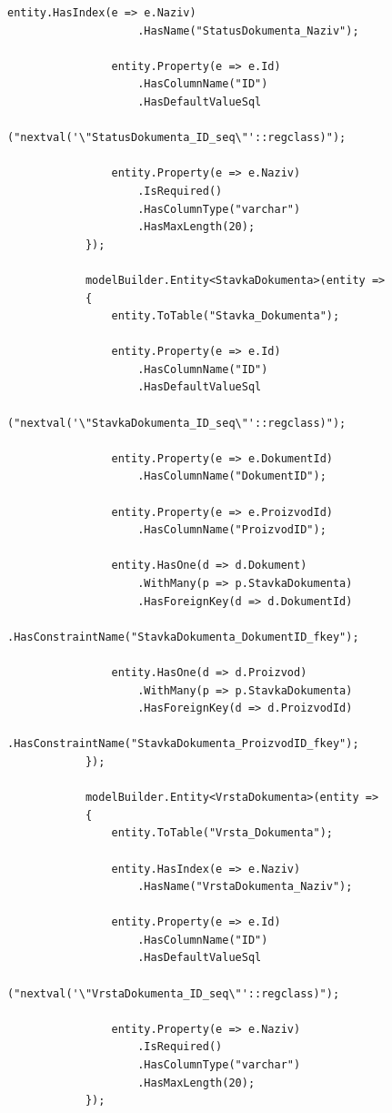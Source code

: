 \documentclass[a4paper,12pt]{foi}
\begin{document}
\begin{lstlisting}[language={[Sharp]C}]
                entity.HasIndex(e => e.Naziv)
                    .HasName("StatusDokumenta_Naziv");

                entity.Property(e => e.Id)
                    .HasColumnName("ID")
                    .HasDefaultValueSql
                    ("nextval('\"StatusDokumenta_ID_seq\"'::regclass)");

                entity.Property(e => e.Naziv)
                    .IsRequired()
                    .HasColumnType("varchar")
                    .HasMaxLength(20);
            });

            modelBuilder.Entity<StavkaDokumenta>(entity =>
            {
                entity.ToTable("Stavka_Dokumenta");

                entity.Property(e => e.Id)
                    .HasColumnName("ID")
                    .HasDefaultValueSql
                    ("nextval('\"StavkaDokumenta_ID_seq\"'::regclass)");

                entity.Property(e => e.DokumentId)
                	.HasColumnName("DokumentID");

                entity.Property(e => e.ProizvodId)
                	.HasColumnName("ProizvodID");

                entity.HasOne(d => d.Dokument)
                    .WithMany(p => p.StavkaDokumenta)
                    .HasForeignKey(d => d.DokumentId)
                    .HasConstraintName("StavkaDokumenta_DokumentID_fkey");

                entity.HasOne(d => d.Proizvod)
                    .WithMany(p => p.StavkaDokumenta)
                    .HasForeignKey(d => d.ProizvodId)
                    .HasConstraintName("StavkaDokumenta_ProizvodID_fkey");
            });

            modelBuilder.Entity<VrstaDokumenta>(entity =>
            {
                entity.ToTable("Vrsta_Dokumenta");

                entity.HasIndex(e => e.Naziv)
                    .HasName("VrstaDokumenta_Naziv");

                entity.Property(e => e.Id)
                    .HasColumnName("ID")
                    .HasDefaultValueSql
                    ("nextval('\"VrstaDokumenta_ID_seq\"'::regclass)");

                entity.Property(e => e.Naziv)
                    .IsRequired()
                    .HasColumnType("varchar")
                    .HasMaxLength(20);
            });


\end{lstlisting}
\end{document}

